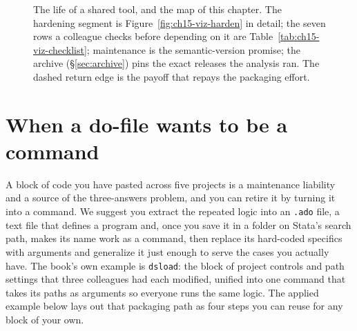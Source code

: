 \documentclass[
    a4paper,
    fontsize=10pt,
    twoside=true,
    numbers=noenddot,
]{kaobook}
\begin{document}
\begin{figure}[htbp]
\centering
{}
\caption[The life of a shared tool]{The life of a shared tool, and the map of this chapter. The hardening segment is Figure~\ref{fig:ch15-viz-harden} in detail; the seven rows a colleague checks before depending on it are Table~\ref{tab:ch15-viz-checklist}; maintenance is the semantic-version promise; the archive (\S\ref{sec:archive}) pins the exact releases the analysis ran. The dashed return edge is the payoff that repays the packaging effort.}
\label{fig:ch15-viz-lifecycle}
\end{figure}

\section{When a do-file wants to be a command}
A block of code you have pasted across five projects is a maintenance liability and a source of the three-answers problem, and you can retire it by turning it into a command. We suggest you extract the repeated logic into an \texttt{.ado} file, a text file that defines a program and, once you save it in a folder on Stata's search path, makes its name work as a command, then replace its hard-coded specifics with arguments and generalize it just enough to serve the cases you actually have. The book's own example is \texttt{dsload}: the block of project controls and path settings that three colleagues had each modified, unified into one command that takes its paths as arguments so everyone runs the same logic. The applied example below lays out that packaging path as four steps you can reuse for any block of your own.
\end{document}
